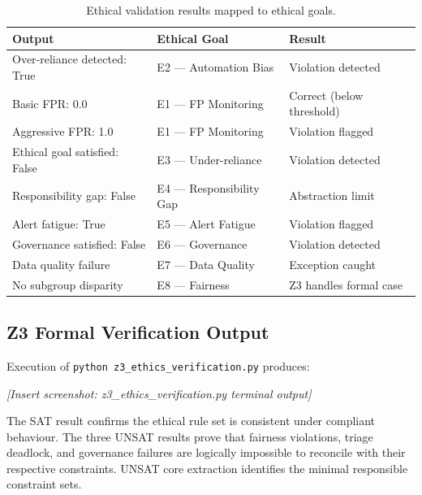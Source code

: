 \documentclass[]{UCD_CS_41820_Report}
\begin{document}
\begin{table}[H]
\centering
\renewcommand{\arraystretch}{1.3}
\begin{tabular}{@{}lll@{}}
\toprule
\textbf{Output} & \textbf{Ethical Goal} & \textbf{Result} \\
\midrule
Over-reliance detected: True    & E2 --- Automation Bias        & Violation detected \\
Basic FPR: 0.0                  & E1 --- FP Monitoring          & Correct (below threshold) \\
Aggressive FPR: 1.0             & E1 --- FP Monitoring          & Violation flagged \\
Ethical goal satisfied: False   & E3 --- Under-reliance         & Violation detected \\
Responsibility gap: False       & E4 --- Responsibility Gap     & Abstraction limit \\
Alert fatigue: True             & E5 --- Alert Fatigue          & Violation flagged \\
Governance satisfied: False     & E6 --- Governance             & Violation detected \\
Data quality failure            & E7 --- Data Quality           & Exception caught \\
No subgroup disparity           & E8 --- Fairness               & Z3 handles formal case \\
\bottomrule
\end{tabular}
\caption{Ethical validation results mapped to ethical goals.}
\label{tab:ethical_results}
\end{table}

\subsection*{Z3 Formal Verification Output}

Execution of \texttt{python z3\_ethics\_verification.py} produces:

\noindent\textit{[Insert screenshot: z3\_ethics\_verification.py terminal output]}

The SAT result confirms the ethical rule set is consistent under compliant
behaviour. The three UNSAT results prove that fairness violations, triage deadlock,
and governance failures are logically impossible to reconcile with their respective
constraints. UNSAT core extraction identifies the minimal responsible constraint
sets.
\end{document}
